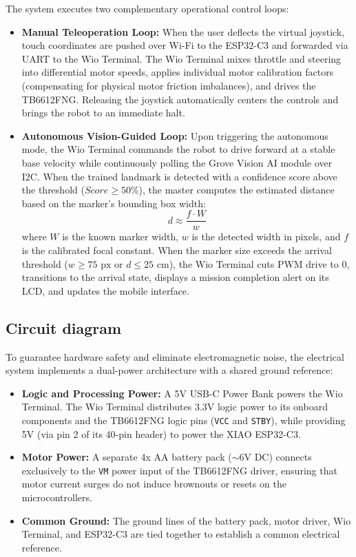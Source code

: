 \documentclass{article}
\begin{document}
The system executes two complementary operational control loops:

\begin{itemize}
    \item \textbf{Manual Teleoperation Loop:} When the user deflects the virtual joystick, touch coordinates are pushed over Wi-Fi to the ESP32-C3 and forwarded via UART to the Wio Terminal. The Wio Terminal mixes throttle and steering into differential motor speeds, applies individual motor calibration factors (compensating for physical motor friction imbalances), and drives the TB6612FNG. Releasing the joystick automatically centers the controls and brings the robot to an immediate halt.
    \item \textbf{Autonomous Vision-Guided Loop:} Upon triggering the autonomous mode, the Wio Terminal commands the robot to drive forward at a stable base velocity while continuously polling the Grove Vision AI module over I2C. When the trained landmark is detected with a confidence score above the threshold ($Score \ge 50\%$), the master computes the estimated distance based on the marker's bounding box width:
    \begin{equation}
        d \approx \frac{f \cdot W}{w}
    \end{equation}
    where $W$ is the known marker width, $w$ is the detected width in pixels, and $f$ is the calibrated focal constant. When the marker size exceeds the arrival threshold ($w \ge 75\text{ px}$ or $d \le 25\text{ cm}$), the Wio Terminal cuts PWM drive to 0, transitions to the arrival state, displays a mission completion alert on its LCD, and updates the mobile interface.
\end{itemize}

\subsection{Circuit diagram}

To guarantee hardware safety and eliminate electromagnetic noise, the electrical system implements a dual-power architecture with a shared ground reference:
\begin{itemize}
    \item \textbf{Logic and Processing Power:} A 5V USB-C Power Bank powers the Wio Terminal. The Wio Terminal distributes 3.3V logic power to its onboard components and the TB6612FNG logic pins (\texttt{VCC} and \texttt{STBY}), while providing 5V (via pin 2 of its 40-pin header) to power the XIAO ESP32-C3.
    \item \textbf{Motor Power:} A separate 4x AA battery pack ($\sim$6V DC) connects exclusively to the \texttt{VM} power input of the TB6612FNG driver, ensuring that motor current surges do not induce brownouts or resets on the microcontrollers.
    \item \textbf{Common Ground:} The ground lines of the battery pack, motor driver, Wio Terminal, and ESP32-C3 are tied together to establish a common electrical reference.
\end{itemize}
\end{document}
